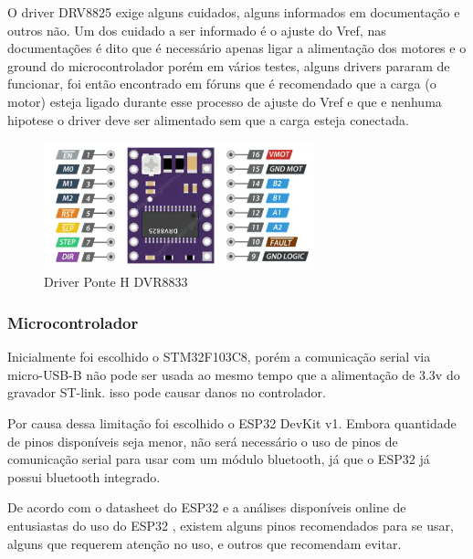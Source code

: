 O driver DRV8825 exige alguns cuidados, alguns informados em documentação e outros não.
Um dos cuidado a ser informado é o ajuste do Vref, nas documentações é dito que é necessário apenas ligar a alimentação dos motores e o ground do microcontrolador
porém em vários testes, alguns drivers pararam de funcionar,  foi então encontrado em fóruns que é recomendado que a carga (o motor) esteja ligado durante esse processo de ajuste do Vref
e que e nenhuma hipotese o driver deve ser alimentado sem que a carga esteja conectada.


\begin{figure}[htb]
	\centering
	\includegraphics[width=0.7\textwidth]{figures/DRV8825}
	\caption{Driver Ponte H DVR8833 \cite{DRV8833_image}}
\end{figure}


\subsubsection{Microcontrolador}


Inicialmente foi escolhido o STM32F103C8, porém a comunicação serial via micro-USB-B não pode ser usada ao mesmo tempo que
a alimentação de 3.3v do gravador ST-link. isso pode causar danos no controlador. 


Por causa dessa limitação foi escolhido o ESP32 DevKit v1.
Embora  quantidade de pinos disponíveis seja menor, não será necessário o uso de pinos de comunicação serial para usar com um módulo bluetooth,
já que o ESP32 já possui bluetooth integrado.

De acordo com o datasheet do ESP32 \cite{esp32_datasheet} e a análises disponíveis online de entusiastas do uso do ESP32 \cite{esp32_reference},
existem alguns pinos recomendados para se usar, alguns que requerem atenção no uso, e outros que recomendam evitar.

